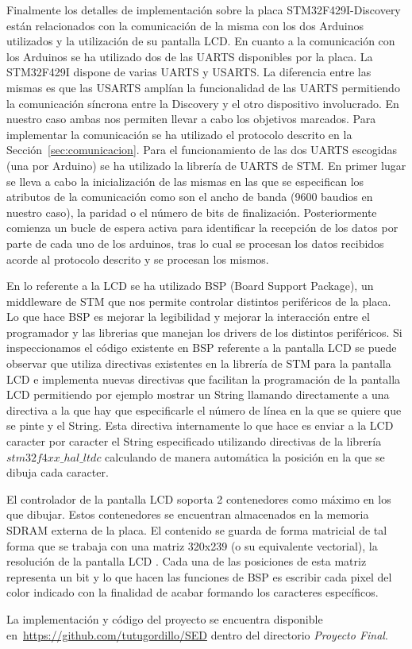 Finalmente los detalles de implementaci\'on sobre la placa
STM32F429I-Discovery est\'an relacionados con la comunicaci\'on de la
misma con los dos Arduinos utilizados y la utilizaci\'on de su
pantalla LCD. En cuanto a la comunicaci\'on con los Arduinos se ha
utilizado dos de las UARTS disponibles por la placa. La STM32F429I
dispone de varias UARTS y USARTS. La diferencia entre las mismas es
que las USARTS ampl\'ian la funcionalidad de las UARTS permitiendo la
comunicaci\'on s\'incrona entre la Discovery y el otro dispositivo
involucrado. En nuestro caso ambas nos permiten
llevar a cabo los objetivos marcados. Para implementar la
comunicaci\'on se ha utilizado el protocolo descrito en la
Secci\'on~\ref{sec:comunicacion}. Para el funcionamiento de las dos
UARTS escogidas (una por Arduino) se ha utilizado la librer\'ia de UARTS
de STM. En primer lugar se lleva a cabo la inicializaci\'on de las
mismas en las que se especifican los atributos de la comunicaci\'on
como son el ancho de banda (9600 baudios en nuestro caso), la paridad
o el n\'umero de bits de finalizaci\'on. Posteriormente comienza un
bucle de espera activa para identificar la recepci\'on de los datos
por parte de cada uno de los arduinos, tras lo cual se procesan los
datos recibidos acorde al protocolo descrito y se procesan los mismos.

En lo referente a la LCD se ha utilizado BSP (Board Support Package),
un middleware de STM que nos permite controlar distintos perif\'ericos
de la placa. Lo que hace BSP es mejorar la legibilidad y mejorar la
interacci\'on entre el programador y las librerias que manejan los
drivers de los distintos perif\'ericos.  Si inspeccionamos el c\'odigo
existente en BSP referente a la pantalla LCD se puede observar
que utiliza directivas existentes en la librer\'ia de
STM para la pantalla LCD e implementa nuevas directivas que facilitan
la programaci\'on de la pantalla LCD permitiendo por ejemplo mostrar
un String llamando directamente a una directiva a la que hay que
especificarle el n\'umero de l\'inea en la que se quiere que se pinte
y el String. Esta directiva internamente lo que hace es enviar a la
LCD caracter por caracter el String especificado utilizando directivas
de la librer\'ia $stm32f4xx\_hal\_ltdc$ calculando de manera autom\'atica la posici\'on en la
que se dibuja cada caracter.

El controlador de la pantalla LCD soporta 2 contenedores como m\'aximo
en los que dibujar. Estos contenedores se encuentran almacenados en la
memoria SDRAM externa de la placa. El contenido se guarda de forma
matricial de tal forma que se trabaja con una matriz 320x239 (o su
equivalente vectorial), la
resoluci\'on de la pantalla LCD . Cada una de las posiciones de esta
matriz representa un bit y lo que hacen las funciones de BSP es
escribir cada pixel del color indicado con la finalidad de acabar
formando los caracteres espec\'ificos.

La implementaci\'on y c\'odigo del proyecto se encuentra disponible en~\url{https://github.com/tutugordillo/SED} dentro del directorio
\emph{Proyecto Final}.  
